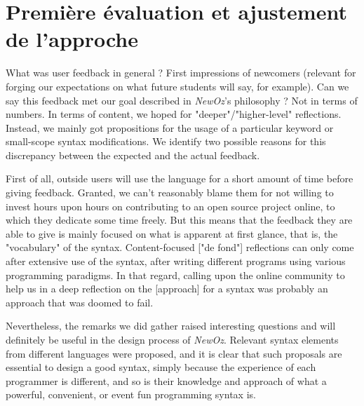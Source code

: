 \section{Première évaluation et ajustement de l'approche}\label{sec:ch4-adjustments}
What was user feedback in general ?
First impressions of newcomers (relevant for forging our expectations on what future students will say, for example).\newline
Can we say this feedback met our goal described in \textit{NewOz}'s philosophy ?
Not in terms of numbers.
In terms of content, we hoped for "deeper"/"higher-level" reflections.
Instead, we mainly got propositions for the usage of a particular keyword or small-scope syntax modifications.\newline
We identify two possible reasons for this discrepancy between the expected and the actual feedback.\newline

First of all, outside users will use the language for a short amount of time before giving feedback.
Granted, we can't reasonably blame them for not willing to invest hours upon hours on contributing to an open source project online, to which they dedicate some time freely.
But this means that the feedback they are able to give is mainly focused on what is apparent at first glance, that is, the "vocabulary" of the syntax.
Content-focused ["de fond"] reflections can only come after extensive use of the syntax, after writing different programs using various programming paradigms.
In that regard, calling upon the online community to help us in a deep reflection on the [approach] for a syntax was probably an approach that was doomed to fail.\newline

Nevertheless, the remarks we did gather raised interesting questions and will definitely be useful in the design process of \textit{NewOz}.
Relevant syntax elements from different languages were proposed, and it is clear that such proposals are essential to design a good syntax, simply because the experience of each programmer is different, and so is their knowledge and approach of what a powerful, convenient, or event fun programming syntax is.

